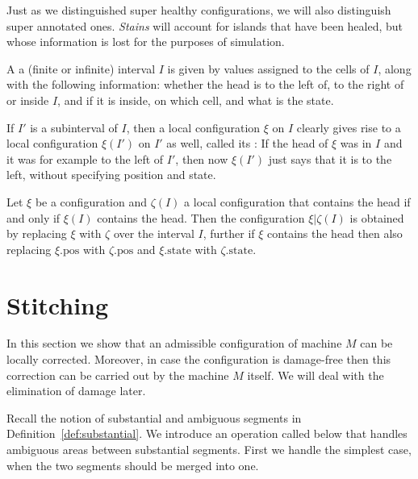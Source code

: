 \documentclass[12pt]{memoir}
\newcommand{\pos}{\mathrm{pos}}
\newcommand{\state}{\mathrm{state}}
\begin{document}
Just as we distinguished super healthy configurations, we will also distinguish super 
annotated ones.
\emph{Stains} will account for islands that have been healed, but whose information
is lost for the purposes of simulation.



\begin{definition}
\label{def:local-config}
  A  a (finite or infinite)
  interval \( I \) is given by values assigned to the cells
  of \( I \), along with the following information: whether
  the head is to the left of, to the right of or inside
  \( I \), and if it is inside, on which cell, and what is
  the state.

  If \( I' \) is a subinterval of \( I \), then a local configuration
  \( \xi \) on \( I \) clearly gives rise to a local configuration
  \( \xi(I') \) on \( I' \) as well, called its
  : If the head of \( \xi \) was in \( I \)
  and it was for example to the left of \( I' \), then now
  \( \xi(I') \) just says that it is to the left, without
  specifying position and state.

  Let \( \xi \) be a configuration and \( \zeta(I) \) a local
  configuration that contains the head if and only if
  \( \xi(I) \) contains the head.
  Then the configuration \( \xi|\zeta(I) \) is obtained by
  replacing \( \xi \) with \( \zeta \) over the interval \( I \),
  further if \( \xi \) contains the head then also replacing
  \( \xi.\pos \) with \( \zeta.\pos \) and \( \xi.\state \) with
  \( \zeta.\state \).
\end{definition}


\section{Stitching}\label{sec:stitching}

In this section we show that an admissible configuration of machine \( M \)
can be locally corrected.
Moreover, in case the configuration is damage-free then this correction
can be carried out by the machine \( M \) itself.
We will deal with the elimination of damage later.

Recall the notion of substantial and ambiguous segments in
Definition~\ref{def:substantial}.
We introduce an operation called  below that handles
ambiguous areas between substantial segments.
First we handle the simplest case, when the two segments should be
merged into one.
\end{document}
